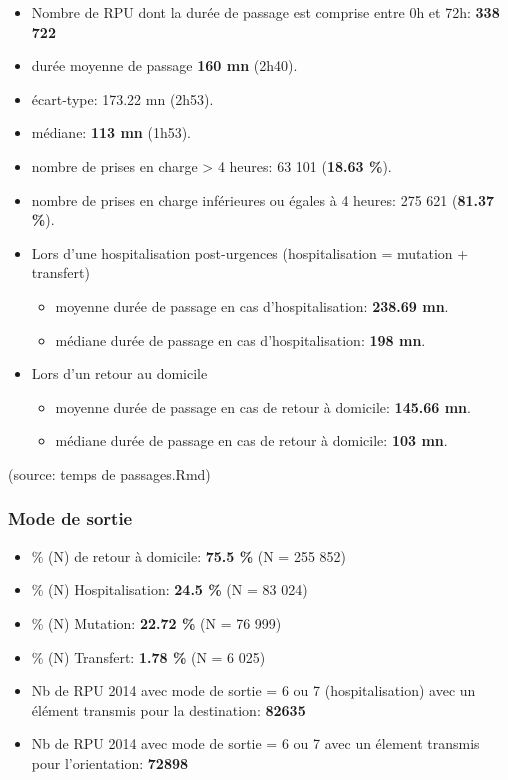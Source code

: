 \documentclass[]{article}
\begin{document}
\begin{itemize}
\item
  Nombre de RPU dont la durée de passage est comprise entre 0h et 72h:
  \textbf{338 722}
\item
  durée moyenne de passage \textbf{160 mn} (2h40).
\item
  écart-type: 173.22 mn (2h53).
\item
  médiane: \textbf{113 mn} (1h53).
\item
  nombre de prises en charge \textgreater{} 4 heures: 63 101
  (\textbf{18.63 \%}).
\item
  nombre de prises en charge inférieures ou égales à 4 heures: 275 621
  (\textbf{81.37 \%}).
\item
  Lors d'une hospitalisation post-urgences (hospitalisation = mutation +
  transfert)

  \begin{itemize}
  \itemsep1pt\parskip0pt
  \item
    moyenne durée de passage en cas d'hospitalisation: \textbf{238.69
    mn}.
  \item
    médiane durée de passage en cas d'hospitalisation: \textbf{198 mn}.
  \end{itemize}
\item
  Lors d'un retour au domicile

  \begin{itemize}
  \itemsep1pt\parskip0pt
  \item
    moyenne durée de passage en cas de retour à domicile: \textbf{145.66
    mn}.
  \item
    médiane durée de passage en cas de retour à domicile: \textbf{103
    mn}.
  \end{itemize}
\end{itemize}

(source: temps de passages.Rmd)

\subsubsection{Mode de sortie}\label{mode-de-sortie}

\begin{itemize}
\itemsep1pt\parskip0pt
\item
  \% (N) de retour à domicile: \textbf{75.5 \%} (N = 255 852)
\item
  \% (N) Hospitalisation: \textbf{24.5 \%} (N = 83 024)
\item
  \% (N) Mutation: \textbf{22.72 \%} (N = 76 999)
\item
  \% (N) Transfert: \textbf{1.78 \%} (N = 6 025)
\item
  Nb de RPU 2014 avec mode de sortie = 6 ou 7 (hospitalisation) avec un
  élément transmis pour la destination: \textbf{82635}
\item
  Nb de RPU 2014 avec mode de sortie = 6 ou 7 avec un élement transmis
  pour l'orientation: \textbf{72898}
\end{itemize}
\end{document}
